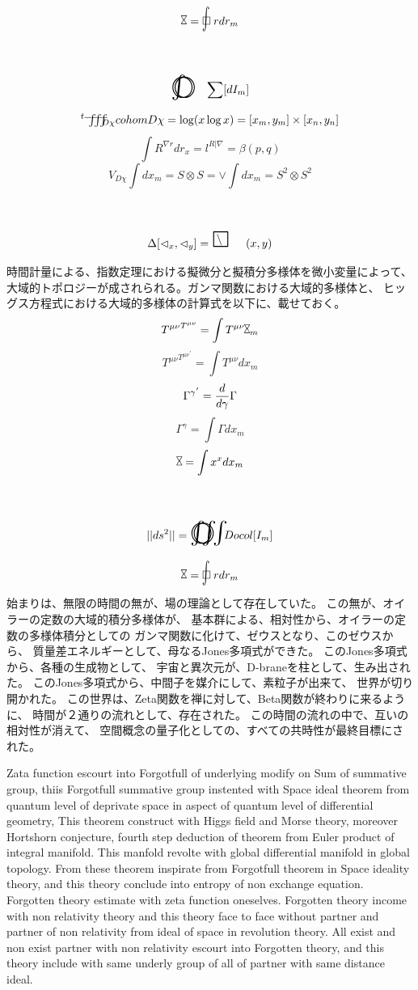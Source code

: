 \documentclass{jsarticle}
\begin{document}
 	
$$ \timebow = \flowerletter r dr_m $$

 
$$ \whitewithbodercircleint \sum [dI_m] $$
$$ {}^t\variiint_{D\chi} cohom D\chi = \log(x\log x) = [x_m,y_m]\times
[x_n,y_n] $$
$$ \int R^{\nabla r}dr_x = l^{R|\nabla} = \beta(p,q) $$
$$ V_{D\chi}\int dx_m = S \otimes S = \vee\int dx_m = S^2 \otimes S^2 $$
$$ \Delta[\vartriangleleft_x,\vartriangleleft_y] = \average(x,y) $$


         時間計量による、指数定理における擬微分と擬積分多様体を微小変量によって、
   大域的トポロジーが成されられる。ガンマ関数における大域的多様体と、
   ヒッグス方程式における大域的多様体の計算式を以下に、載せておく。
   $$ {T^{\mu\nu}}^{T^{\mu\nu}} = \int T^{\mu\nu} \rotatebox{90}{$\bowtie$}_m $$
   $$   {T^{\mu\nu}}^{{T^{\mu\nu}}^{'}}=\int T^{\mu\nu}dx_m  $$
      $$ {\Gamma^{\gamma}}^{'} = {d \over {d \gamma}}\Gamma $$
   $$ \Gamma^{\gamma} = \int \Gamma dx_m $$
   $$ \rotatebox{90}{$\bowtie$} = \int x^x dx_m $$


$$ ||ds^2|| = \whitewithbodercircleiiint Docol[I_m] $$

 	
$$ \timebow = \flowerletter r dr_m $$


  始まりは、無限の時間の無が、場の理論として存在していた。
  この無が、オイラーの定数の大域的積分多様体が、
  基本群による、相対性から、オイラーの定数の多様体積分としての
  ガンマ関数に化けて、ゼウスとなり、このゼウスから、
  質量差エネルギーとして、母なるJones多項式ができた。
  このJones多項式から、各種の生成物として、
  宇宙と異次元が、D-braneを柱として、生み出された。
  このJones多項式から、中間子を媒介にして、素粒子が出来て、
  世界が切り開かれた。
  この世界は、Zeta関数を禅に対して、Beta関数が終わりに来るように、
  時間が２通りの流れとして、存在された。
  この時間の流れの中で、互いの相対性が消えて、
  空間概念の量子化としての、すべての共時性が最終目標にされた。


     Zata function escourt into Forgotfull of underlying modify on Sum
   of summative group, thiis Forgotfull summative group instented with
   Space ideal theorem from quantum level of deprivate space in aspect
   of quantum level of differential geometry,
   This theorem construct with Higgs field and Morse theory, moreover
   Hortshorn conjecture, fourth step deduction of theorem from 
   Euler product of integral manifold.
   This manfold revolte with global differential manifold in global topology.
   From these theorem inspirate from Forgotfull theorem in Space ideality
   theory, and this theory conclude into entropy of non exchange equation.
   Forgotten theory estimate with zeta function oneselves.
   Forgotten theory income with non relativity theory and this theory
   face to face without partner and partner of non relativity from
   ideal of space in revolution theory.
   All exist and non exist partner with non relativity escourt into 
   Forgotten theory, and this theory include with same underly group
   of all of partner with same distance ideal.
\end{document}

